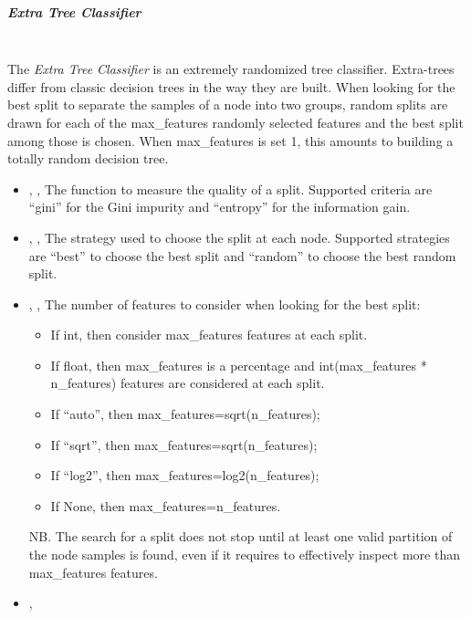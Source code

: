 \subparagraph{Extra Tree Classifier}
\mbox{}
\\The \textit{Extra Tree Classifier} is an extremely randomized tree classifier.
%
Extra-trees differ from classic decision trees in the way they are built.
%
When looking for the best split to separate the samples of a node into two
groups, random splits are drawn for each of the max\_features randomly selected
features and the best split among those is chosen.
%
When max\_features is set 1, this amounts to building a totally random decision
tree.
%
\begin{itemize}
  \item {} , ,
  The function to measure the quality of a split.
  Supported criteria are ``gini'' for the Gini impurity and ``entropy'' for the
  information gain.
  \item {} , ,
  The strategy used to choose the split at each node.
  Supported strategies are ``best'' to choose the best split and ``random'' to
  choose the best random split.
  \item {} , ,
  The number of features to consider when looking for the best split:
\begin{itemize}
    \item If int, then consider max\_features features at each split.
    \item If float, then max\_features is a percentage and int(max\_features *
    n\_features) features are considered at each split.
    \item If “auto”, then max\_features=sqrt(n\_features);
    \item If “sqrt”, then max\_features=sqrt(n\_features);
    \item If “log2”, then max\_features=log2(n\_features);
    \item If None, then max\_features=n\_features.
\end{itemize}
  NB.
  The search for a split does not stop until at least one valid partition of the
  node samples is found, even if it requires to effectively inspect more than
  max\_features features.
  \\
  \item {} , 
\end{itemize}
